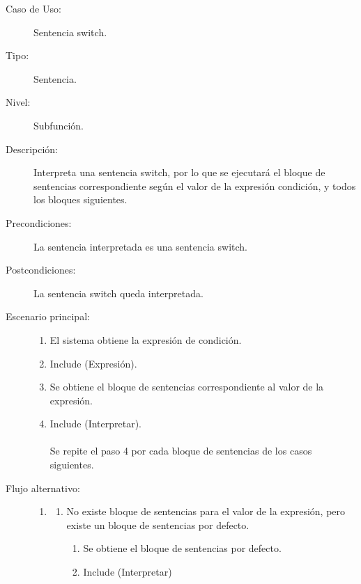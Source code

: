 \begin{framed}
\FloatBarrier
\begin{description}
   \item[Caso de Uso:]  Sentencia switch.
   \item [Tipo:] Sentencia. 
   \item[Nivel:]  Subfunción.
   \item[Descripción:] 
   Interpreta una sentencia switch, por lo que se ejecutará el bloque de sentencias 
   correspondiente según el valor de la expresión condición, y todos los bloques
   siguientes.
   \item[Precondiciones:] 
   La sentencia interpretada es una sentencia switch.
   \item[Postcondiciones:] 
       La sentencia switch queda interpretada.
   \item[Escenario principal:] \hfill
   \begin{enumerate}
   \item El sistema obtiene la expresión de condición.
   \item Include (Expresión).
   \item Se obtiene el bloque de sentencias correspondiente al valor de la expresión.
   \item Include (Interpretar). \\\\ \hfill
      Se repite el paso 4 por cada bloque de sentencias de los casos siguientes.
   \end{enumerate}
   \item[Flujo alternativo:] \hfill 
   \begin{enumerate} \itemsep1pt \parskip0pt 
   \setcounter{enumi}{2}
   \renewcommand{\labelenumi}{}
   \renewcommand{\labelenumiii}{\arabic{enumiii}.}
   \renewcommand{\labelenumii}{\arabic{enumi}\alph{enumii}.}
      \item 
      \begin {enumerate}
         \setcounter{enumii}{0}
         \item No existe bloque de sentencias para el valor de la expresión, pero 
         existe un bloque de sentencias por defecto.
         \begin{enumerate}
         \item Se obtiene el bloque de sentencias por defecto.
         \item Include (Interpretar)  
         \end{enumerate}
      \end{enumerate}

\end{enumerate}
\end{description}
\end{framed}
